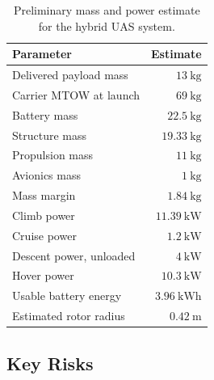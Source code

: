 \begin{table}[H]
    \centering
    \caption{Preliminary mass and power estimate for the hybrid  UAS system.}
    \label{tab:carrier_sizing}
    \begin{tabular}{lr}
        \hline
        Parameter & Estimate \\
        \hline
        Delivered payload mass & $13~\mathrm{kg}$ \\
        Carrier MTOW at launch & $69~\mathrm{kg}$ \\
        Battery mass & $22.5~\mathrm{kg}$ \\
        Structure mass & $19.33~\mathrm{kg}$ \\
        Propulsion mass & $11~\mathrm{kg}$ \\
        Avionics mass & $1~\mathrm{kg}$ \\
        Mass margin & $1.84~\mathrm{kg}$ \\
        Climb power & $11.39~\mathrm{kW}$ \\
        Cruise power & $1.2~\mathrm{kW}$ \\
        Descent power, unloaded & $4~\mathrm{kW}$ \\
        Hover power & $10.3~\mathrm{kW}$\\
        Usable battery energy & $3.96~\mathrm{kWh}$ \\
        Estimated rotor radius & $0.42~\mathrm{m}$ \\
        \hline
    \end{tabular}
\end{table}



\subsection{Key Risks}

